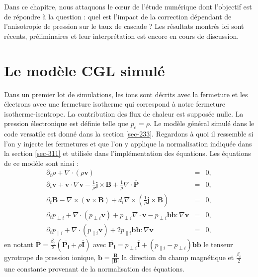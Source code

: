  Dans ce chapitre, nous attaquons le cœur de l'étude numérique dont l'objectif est de répondre à la question : quel est l'impact de la correction dépendant de l'anisotropie de pression sur le taux de cascade ? Les résultats montrés ici sont récents, préliminaires et leur interprétation est encore en cours de discussion.
 
 \section{Le modèle CGL simulé} \label{sec-331}
 
 Dans un premier lot de simulations, les ions sont décrits avec la fermeture  et les électrons avec une fermeture isotherme qui correspond à notre fermeture isotherme-isentrope. La contribution des flux de chaleur est supposée nulle. La pression électronique est définie telle que $p_e = \rho$. Le modèle général  simulé dans le code versatile est donné dans la section \ref{sec-233}. Regardons à quoi il ressemble si l'on y injecte les fermetures et que l'on y applique la normalisation indiquée dans la section \ref{sec-311} et utilisée dans l'implémentation des équations. Les équations de ce modèle sont ainsi :
 \begin{eqnarray}
 \label{eq:mcgl_r} \partial_t \rho + \nabla \cdot \left(\rho \boldsymbol{v}\right) &=& 0,\\
 \label{eq:mcgl_v} \partial_t  \boldsymbol{v} + \boldsymbol{v} \cdot \nabla  \boldsymbol{v} - \frac{1}{\rho} \boldsymbol{j} \times \boldsymbol{B} + \frac{1}{\rho} \nabla \cdot \overline{\boldsymbol{P}}  &=& 0,  \\
 \label{eq:mcgl_b} \partial_t \boldsymbol{B} - \nabla \times \left( \boldsymbol{v} \times \boldsymbol{B} \right) +  d_i  \nabla \times \left( \frac{1}{\rho} \boldsymbol{j}\times \boldsymbol{B} \right) &=& 0 , \\
 \label{eq:mcgl_pperp} \partial_t  p_{\perp i }  +  \nabla \cdot \left(p_{\perp i } \boldsymbol{v} \right) +  p_{\perp i }\nabla \cdot\boldsymbol{v} -  p_{\perp i } \boldsymbol{b}\boldsymbol{b} : \nabla \boldsymbol{v}  &=& 0  ,\\
 \label{eq:mcgl_ppar} \partial_t  p_{\parallel i }  +  \nabla \cdot \left(p_{\parallel i } \boldsymbol{v} \right) +  2 p_{\parallel i }  \boldsymbol{b}\boldsymbol{b} : \nabla \boldsymbol{v}  &=& 0  ,
 \end{eqnarray}
 en notant $\overline{\boldsymbol{P}} =  \frac{\beta_0}{2} \left(\overline{\boldsymbol{P_i}} + \rho \overline{\boldsymbol{I}} \right)$ avec $\overline{\boldsymbol{P_i}} = p_{\perp i } \overline{\boldsymbol{I}} + \left(p_{\parallel i } - p_{\perp i }\right) \boldsymbol{b} \boldsymbol{b}$ le tenseur gyrotrope de pression ionique, $\boldsymbol{b} = \frac{\boldsymbol{B}}{|\boldsymbol{B}|}$ la direction du champ magnétique et $\frac{\beta_0}{2} $ une constante provenant de la normalisation des équations.
 
